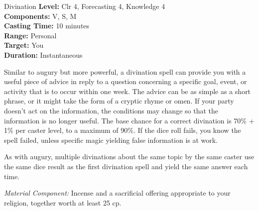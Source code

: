 {Divination}
{
	\textbf{Level:}
	Clr 4, Forecasting 4, Knowledge 4\\
	\textbf{Components:}
	V, S, M\\
	\textbf{Casting Time:}
	10 minutes\\
	\textbf{Range:}
	Personal\\
	\textbf{Target:}
	You\\
	\textbf{Duration:}
	Instantaneous\\
}
{
	Similar to augury but more powerful, a divination spell can provide you with a useful piece of advice in reply to a question concerning a specific goal, event, or activity that is to occur within one week. The advice can be as simple as a short phrase, or it might take the form of a cryptic rhyme or omen. If your party doesn't act on the information, the conditions may change so that the information is no longer useful. The base chance for a correct divination is 70\% + 1\% per caster level, to a maximum of 90\%. If the dice roll fails, you know the spell failed, unless specific magic yielding false information is at work.

	As with augury, multiple divinations about the same topic by the same caster use the same dice result as the first divination spell and yield the same answer each time.

	\textit{Material Component:}
	Incense and a sacrificial offering appropriate to your religion, together worth at least 25 cp.

}

